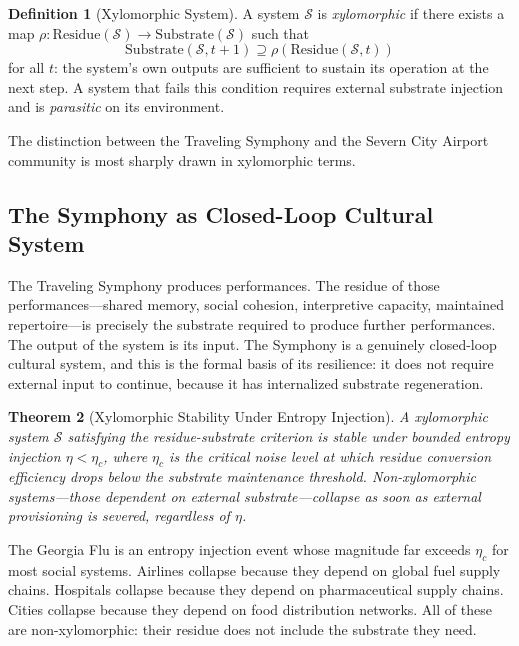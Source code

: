 \documentclass[12pt, oneside]{article}
\theoremstyle{plain}
\newtheorem{theorem}{Theorem}[section]
\theoremstyle{definition}
\newtheorem{definition}[theorem]{Definition}
\theoremstyle{remark}
\begin{document}
\begin{definition}[Xylomorphic System]
A system $\mathcal{S}$ is \emph{xylomorphic} if there exists a
map $\rho : \mathrm{Residue}(\mathcal{S}) \to
\mathrm{Substrate}(\mathcal{S})$ such that
\[
  \mathrm{Substrate}(\mathcal{S}, t+1) \supseteq
  \rho(\mathrm{Residue}(\mathcal{S}, t))
\]
for all $t$: the system's own outputs are sufficient to sustain
its operation at the next step. A system that fails this condition
requires external substrate injection and is \emph{parasitic} on
its environment.
\end{definition}

The distinction between the Traveling Symphony and the Severn City
Airport community is most sharply drawn in xylomorphic terms.

\subsection{The Symphony as Closed-Loop Cultural System}

The Traveling Symphony produces performances. The residue of
those performances---shared memory, social cohesion, interpretive
capacity, maintained repertoire---is precisely the substrate
required to produce further performances. The output of the system
is its input. The Symphony is a genuinely closed-loop cultural
system, and this is the formal basis of its resilience: it does
not require external input to continue, because it has internalized
substrate regeneration.

\begin{theorem}[Xylomorphic Stability Under Entropy Injection]
\label{thm:xylomorphic}
A xylomorphic system $\mathcal{S}$ satisfying the residue-substrate
criterion is stable under bounded entropy injection $\eta < \eta_c$,
where $\eta_c$ is the critical noise level at which residue
conversion efficiency drops below the substrate maintenance
threshold. Non-xylomorphic systems---those dependent on external
substrate---collapse as soon as external provisioning is severed,
regardless of $\eta$.
\end{theorem}

The Georgia Flu is an entropy injection event whose magnitude far
exceeds $\eta_c$ for most social systems. Airlines collapse because
they depend on global fuel supply chains. Hospitals collapse because
they depend on pharmaceutical supply chains. Cities collapse because
they depend on food distribution networks. All of these are
non-xylomorphic: their residue does not include the substrate they
need.
\end{document}
